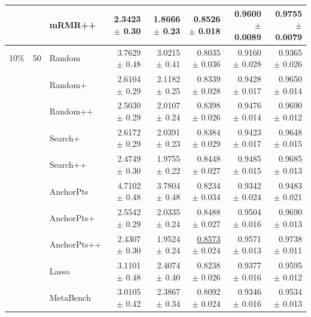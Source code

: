 \begin{longtable}{llp{}rrrrr}
 &  & mRMR++ & \textbf{2.3423} {\scriptsize $\pm$ 0.30} & \textbf{1.8666} {\scriptsize $\pm$ 0.23} & \textbf{0.8526} {\scriptsize $\pm$ 0.018} & \textbf{0.9600} {\scriptsize $\pm$ 0.0089} & \textbf{0.9755} {\scriptsize $\pm$ 0.0079} \\
\midrule
10\% & 50 & Random & 3.7629 {\scriptsize $\pm$ 0.48} & 3.0215 {\scriptsize $\pm$ 0.41} & 0.8035 {\scriptsize $\pm$ 0.036} & 0.9160 {\scriptsize $\pm$ 0.028} & 0.9365 {\scriptsize $\pm$ 0.026} \\
 &  & Random+ & 2.6104 {\scriptsize $\pm$ 0.29} & 2.1182 {\scriptsize $\pm$ 0.25} & 0.8339 {\scriptsize $\pm$ 0.028} & 0.9428 {\scriptsize $\pm$ 0.017} & 0.9650 {\scriptsize $\pm$ 0.014} \\
 &  & Random++ & 2.5030 {\scriptsize $\pm$ 0.29} & 2.0107 {\scriptsize $\pm$ 0.24} & 0.8398 {\scriptsize $\pm$ 0.026} & 0.9476 {\scriptsize $\pm$ 0.014} & 0.9690 {\scriptsize $\pm$ 0.012} \\
 &  & Search+ & 2.6172 {\scriptsize $\pm$ 0.29} & 2.0391 {\scriptsize $\pm$ 0.23} & 0.8384 {\scriptsize $\pm$ 0.029} & 0.9423 {\scriptsize $\pm$ 0.017} & 0.9648 {\scriptsize $\pm$ 0.015} \\
 &  & Search++ & 2.4749 {\scriptsize $\pm$ 0.30} & 1.9755 {\scriptsize $\pm$ 0.22} & 0.8448 {\scriptsize $\pm$ 0.027} & 0.9485 {\scriptsize $\pm$ 0.015} & 0.9685 {\scriptsize $\pm$ 0.013} \\
 &  & AnchorPts & 4.7102 {\scriptsize $\pm$ 0.48} & 3.7804 {\scriptsize $\pm$ 0.48} & 0.8234 {\scriptsize $\pm$ 0.034} & 0.9342 {\scriptsize $\pm$ 0.024} & 0.9483 {\scriptsize $\pm$ 0.021} \\
 &  & AnchorPts+ & 2.5542 {\scriptsize $\pm$ 0.29} & 2.0335 {\scriptsize $\pm$ 0.24} & 0.8488 {\scriptsize $\pm$ 0.027} & 0.9504 {\scriptsize $\pm$ 0.016} & 0.9690 {\scriptsize $\pm$ 0.013} \\
 &  & AnchorPts++ & 2.4307 {\scriptsize $\pm$ 0.30} & 1.9524 {\scriptsize $\pm$ 0.24} & \underline{0.8573} {\scriptsize $\pm$ 0.024} & 0.9571 {\scriptsize $\pm$ 0.013} & 0.9738 {\scriptsize $\pm$ 0.011} \\
 &  & Lasso & 3.1101 {\scriptsize $\pm$ 0.48} & 2.4074 {\scriptsize $\pm$ 0.40} & 0.8238 {\scriptsize $\pm$ 0.026} & 0.9377 {\scriptsize $\pm$ 0.016} & 0.9595 {\scriptsize $\pm$ 0.012} \\
 &  & MetaBench & 3.0105 {\scriptsize $\pm$ 0.42} & 2.3867 {\scriptsize $\pm$ 0.34} & 0.8092 {\scriptsize $\pm$ 0.024} & 0.9346 {\scriptsize $\pm$ 0.016} & 0.9534 {\scriptsize $\pm$ 0.013} \\

\end{longtable}
